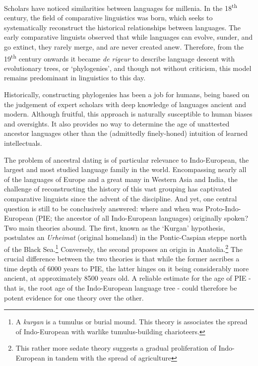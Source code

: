 \documentclass[10pt,journal,compsoc]{IEEEtran}
\newcommand{\ts}{\textsuperscript}
\begin{document}
Scholars have noticed similarities between languages for millenia. In the 18\ts{th} century, the field of comparative linguistics was born, which seeks to systematically reconstruct the historical relationships between languages. The early comparative linguists observed that while languages can evolve, sunder, and go extinct, they rarely merge, and are never created anew. Therefore, from the 19\ts{th} century onwards it became \textit{de rigeur} to describe language descent with evolutionary trees, or `phylogenies', and though not without criticism, this model remains predominant in linguistics to this day.

Historically, constructing phylogenies has been a job for humans, being based on the judgement of expert scholars with deep knowledge of languages ancient and modern. Although fruitful, this approach is naturally susceptible to human biases and oversights. It also provides no way to determine the age of unattested ancestor languages other than the (admittedly finely-honed) intuition of learned intellectuals.

The problem of ancestral dating is of particular relevance to Indo-European, the largest and most studied language family in the world. Encompassing nearly all of the languages of Europe and a great many in Western Asia and India, the challenge of reconstructing the history of this vast grouping has captivated comparative linguists since the advent of the discipline. And yet, one central question is still to be conclusively answered: where and when was Proto-Indo-European (PIE; the ancestor of all Indo-European languages) originally spoken? Two main theories abound. The first, known as the `Kurgan' hypothesis, postulates an \textit{Urheimat} (original homeland) in the Pontic-Caspian steppe north of the Black Sea\cite{gimbutas1974gods}.\footnote{A \textit{kurgan} is a tumulus or burial mound. This theory is associates the spread of Indo-European with warlike tumulus-building charioteers.} Conversely, the second proposes an origin in Anatolia\cite{renfrew2001anatolian}.\footnote{This rather more sedate theory suggests a gradual proliferation of Indo-European in tandem with the spread of agriculture} The crucial difference between the two theories is that while the former ascribes a time depth of 6000 years to PIE, the latter hinges on it being considerably more ancient, at approximately 8500 years old. A reliable estimate for the age of PIE - that is, the root age of the Indo-European language tree - could therefore be potent evidence for one theory over the other.
\end{document}
